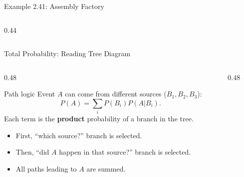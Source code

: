 \documentclass[light]{lutbeamer}
\begin{document}
\begin{frame}{Example 2.41: Assembly Factory}
\begin{columns}[T]
\begin{column}{0.44\textwidth}
        \end{column}
    \end{columns}
\end{frame}




\begin{frame}{Total Probability: Reading Tree Diagram}
    \begin{columns}[T]
        \begin{column}{0.48\textwidth}
            \begin{block}{Path logic}
                Event $A$ can come from different sources ($B_1,B_2,B_3$):
                \[
                P(A)=\sum_i P(B_i)P(A|B_i).
                \]
                Each term is the \textbf{product} probability of a branch in the tree.
            \end{block}
            \begin{itemize}
                \item First, ``which source?'' branch is selected.
                \item Then, ``did $A$ happen in that source?'' branch is selected.
                \item All paths leading to $A$ are summed.
            \end{itemize}
        \end{column}
        \begin{column}{0.48\textwidth}
            \centering
\end{column}
\end{columns}
\end{frame}
\end{document}
